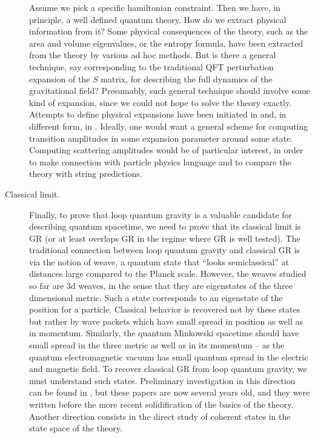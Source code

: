 \begin{description}
Assume we pick a specific hamiltonian constraint.  Then we 
have, in principle, a well defined quantum theory.  How do 
we extract physical information from it?  Some physical 
consequences of the theory, such as the area and volume 
eigenvalues, or the entropy formula, have been extracted 
from the theory by various ad hoc methods.  But is there a 
general technique, say corresponding to the traditional QFT 
perturbation expansion of the $S$ matrix, for describing 
the full dynamics of the gravitational field?  Presumably, 
such general technique should involve some kind of 
expansion, since we could not hope to solve 
the theory exactly.  Attempts to define physical 
expansions have been initiated in \cite{Rovelli95b} 
and, in different form, in \cite{ReisenbergerRovelli}.  
Ideally, one would want a general scheme for computing transition 
amplitudes in some expansion parameter around some 
state. Computing scattering amplitudes would be of 
particular interest, in order to make connection with 
particle physics language and to compare the theory with 
string predictions. 

\item[Classical limit.]

Finally, to prove that loop quantum gravity is a valuable 
candidate for describing quantum spacetime, we need to prove that 
its classical limit is GR (or at least overlaps GR in the regime 
where GR is well tested).  The traditional connection between loop 
quantum gravity and classical GR is via the notion of weave, a 
quantum state that ``looks semiclassical'' at distances large 
compared to the Planck scale.  However, the weaves studied so far 
\cite{weave,GrotRovelli} are 3d weaves, in the sense that they are 
eigenstates of the three dimensional metric.  Such a state 
corresponds to an eigenstate of the position for a particle.  
Classical behavior is recovered not by these states but rather by 
wave packets which have small spread in position as well as in 
momentum.  Similarly, the quantum Minkowski spacetime should have 
small spread in the three metric as well as in its momentum -- as 
the quantum electromagnetic vacuum has small quantum spread in the 
electric and magnetic field.  To recover classical GR from loop 
quantum gravity, we must understand such states.  Preliminary 
investigation in this direction can be found in 
\cite{IwasakiRovelli2,IwasakiRovelli}, but these papers are now 
several years old, and they were written before the more recent 
solidification of the basics of the theory.  Another direction 
consists in the direct study of coherent states in the state space 
of the theory.

\end{description}


